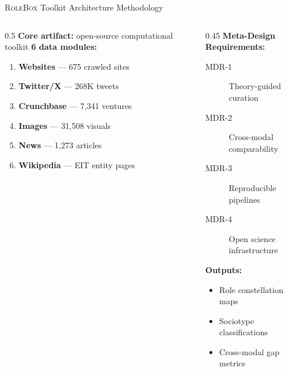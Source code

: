 \documentclass[aspectratio=169]{beamer}
\newcommand{\RoleBox}{\textsc{RoleBox}}
\newcommand{\secmark}[1]{\hfill{\scriptsize\color{gray}#1}}
\newcommand{\iconweb}{\faGlobe}
\newcommand{\iconsocial}{\faTwitter}
\newcommand{\iconinvest}{\faChartLine}
\newcommand{\iconvisual}{\faImage}
\newcommand{\iconnews}{\faNewspaper}
\begin{document}
\begin{frame}{\RoleBox{} Toolkit Architecture}
\secmark{Methodology}
\begin{columns}[T]
\begin{column}{0.5\textwidth}
    \textbf{Core artifact:} open-source computational toolkit
    \vspace{0.5em}
    \textbf{6 data modules:}
    \begin{enumerate}
        \item[\iconweb]     \textbf{Websites} --- 675 crawled sites
        \item[\iconsocial]  \textbf{Twitter/X} --- 268K tweets
        \item[\iconinvest]  \textbf{Crunchbase} --- 7,341 ventures
        \item[\iconvisual]  \textbf{Images} --- 31,508 visuals
        \item[\iconnews]    \textbf{News} --- 1,273 articles
        \item[\faBook]      \textbf{Wikipedia} --- EIT entity pages
    \end{enumerate}
\end{column}
\begin{column}{0.45\textwidth}
    \textbf{Meta-Design Requirements:}
    \begin{description}
        \item[MDR-1] Theory-guided curation
        \item[MDR-2] Cross-modal comparability
        \item[MDR-3] Reproducible pipelines
        \item[MDR-4] Open science infrastructure
    \end{description}
    \vspace{0.5em}
    \textbf{Outputs:}
    \begin{itemize}
        \item Role constellation maps
        \item Sociotype classifications
        \item Cross-modal gap metrics
    \end{itemize}
\end{column}
\end{columns}
\end{frame}
\end{document}
